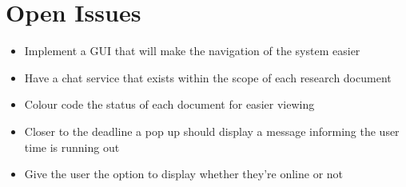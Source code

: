 \documentclass[11pt]{article}
\begin{document}
	\section{Open Issues}
		\begin{itemize}
			\item Implement a GUI that will make the navigation of the system easier
			\item Have a chat service that exists within the scope of each research document
			\item Colour code the status of each document for easier viewing
			\item Closer to the deadline a pop up should display a message informing the user time is running out
			\item Give the user the option to display whether they're online or not
		\end{itemize}	
	\newpage
	
	{}
	
\end{document}
